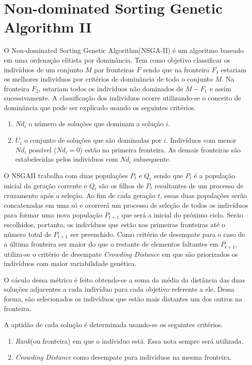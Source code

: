 \documentclass[12pt, %
openright, 
oneside, %
a4paper,    %
brazil]{facom-ufu-abntex2}
\begin{document}
\section{Non-dominated Sorting Genetic Algorithm II}
	O  Non-dominated Sorting Genetic Algorithm(NSGA-II)\cite{NSGAII} é um algoritmo baseado em uma ordenação elitista por dominância. Tem como objetivo classificar os indivíduos de um conjunto $M$ por fronteiras $F$ sendo que na fronteira $F_1$ estariam os melhores indivíduos por critérios de dominância de todo o conjunto $M$. Na fronteira $F_2$, estariam todos os indivíduos não dominados de $M-F_1$ e assim sucessivamente.
    A classificação dos indivíduos ocorre utilizando-se o conceito de dominância que pode ser explicado usando os seguintes critérios.
    \begin{enumerate}
    \item $Nd_i$ o número de soluções que dominam a solução $i$.
    \item $U_i$ o conjunto de soluções que são dominadas por $i$.
 	Indivíduos com menor $Nd_i$ possível ($Nd_i = 0$)  estão na primeira fronteira. As demais fronteiras são estabelecidas pelos individuos com $Nd_i$ subsequente. 
    \end{enumerate}
    
    O NSGAII trabalha com duas populações $P_t$ e $Q_t$ sendo que $P_t$ é a população inicial da geração corrente e $Q_t$ são os filhos de $P_t$ resultantes de um processo de cruzamento após a seleção. Ao fim de cada geração $t$, essas duas populações serão concatenadas em uma só e ocorrerá um processo de seleção de todos os indivíduos para formar uma nova população $P_{t+1}$ que será a inicial do próximo ciclo. Serão escolhidos, portanto, os indivíduos que estão nas primeiras fronteiras até o número total de $P_{t+1}$ ser preenchido. Como critério de desempate para o caso de a última fronteira ser maior do que o restante de elementos faltantes em $P_{t+1}$, utiliza-se o critério de desempate \textit{Crowding Distance} em que são priorizados os indivíduos com maior variabilidade genética.
    
    O cáculo dessa métrica é feito obtendo-se a soma da média da distância das duas soluções adjacentes a cada indivíduo para cada objetivo referente a ele. Dessa forma, são selecionados os indivíduos que estão mais distantes um dos outros na fronteira.
    
    A aptidão de cada solução é determinada usando-se os seguintes critérios.
    
    \begin{enumerate}
    \item \textit{Rank}(ou fronteira) em que o indíviduo está. Essa nota sempre será utilizada.
    \item \textit{Crowding Distance} como desempate para indivíduos na mesma fronteira.
    \end{enumerate}
  
\end{document}
